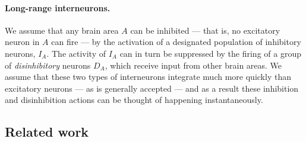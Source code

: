 \documentclass[12pt,nosubfloats]{alt2024} %
\newcommand{\1}{\mathbbm{1}}
\begin{document}
\paragraph{Long-range interneurons.}
We assume that any brain area $A$ can be inhibited --- that is, no excitatory neuron in $A$ can fire --- by the activation of a designated population of inhibitory neurons, $I_A$. The activity of $I_A$ can in turn be suppressed by the firing of a group of {\em disinhibitory} neurons $D_A$, which receive input from other brain areas. We assume that these two types of interneurons integrate much more quickly than excitatory neurons --- as is generally accepted \citep{cruikshank2007synaptic, zhou1998ampa} --- and as a result these inhibition and disinhibition actions can be thought of happening instantaneously. %

\subsection{Related work}

\end{document}
